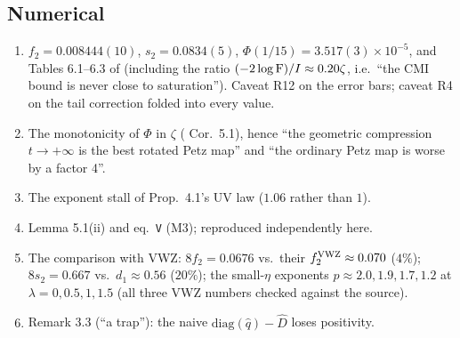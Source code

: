 \documentclass[11pt]{article}
\newcommand{\CMI}{I}
\newcommand{\zz}{\zeta}
\begin{document}
\subsection{Numerical}
\begin{enumerate}[leftmargin=1.7em]
\item[N1.] $f_2=0.008444(10)$, $s_2=0.0834(5)$, $\Phi(1/15)=3.517(3)\times10^{-5}$, and Tables 6.1--6.3 of \NV{}
(including the ratio $(-2\log\Fid)/\CMI\approx0.20\zz$, i.e.\ ``the CMI bound is never close to saturation'').
Caveat R12 on the error bars; caveat R4 on the tail correction folded into every value.
\item[N2.] The monotonicity of $\Phi$ in $\zz$ (\NV{} Cor.~5.1), hence ``the geometric compression $t\to+\infty$ is the
best rotated Petz map'' and ``the ordinary Petz map is worse by a factor 4''.
\item[N3.] The exponent stall of Prop.~4.1's UV law ($1.06$ rather than $1$).
\item[N4.] \NVII{} Lemma 5.1(ii) and eq.~\texttt{V} (M3); reproduced independently here.
\item[N5.] The comparison with VWZ: $8f_2=0.0676$ vs.\ their $f_2^{\rm VWZ}\approx0.070$ ($4\%$); $8s_2=0.667$ vs.\
$d_1\approx0.56$ ($20\%$); the small-$\eta$ exponents $p\approx2.0,1.9,1.7,1.2$ at $\lambda=0,0.5,1,1.5$
(all three VWZ numbers checked against the source).
\item[N6.] \NV{} Remark 3.3 (``a trap''): the naive $\mathrm{diag}(\widehat q)-\widehat D$ loses positivity.
\end{enumerate}
\end{document}
